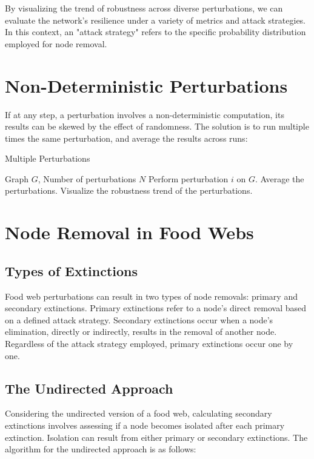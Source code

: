 \documentclass[a4paper, 12pt]{report}
\begin{document}
By visualizing the trend of robustness across diverse perturbations, we can evaluate the network's resilience under a variety of metrics and attack strategies. 
In this context, an "attack strategy" refers to the specific probability distribution employed for node removal. 

\section{Non-Deterministic Perturbations}
If at any step, a perturbation involves a non-deterministic computation,
its results can be skewed by the effect of randomness.
The solution is to run multiple times the same perturbation, 
and average the results across runs:

\begin{minipage}{\textwidth}
\begin{algorithm}[H]
    \caption{Multiple Perturbations}
    \begin{algorithmic}[1]
    \small
    \Require Graph $G$, Number of perturbations $N$
        \State Perform perturbation $i$ on $G$.
    \EndFor
    \State Average the perturbations.
    \State Visualize the robustness trend of the perturbations.
    \end{algorithmic}
\end{algorithm}
\end{minipage}

\section{Node Removal in Food Webs}
\subsection{Types of Extinctions}
Food web perturbations can result in two types of node removals: primary and secondary extinctions. Primary extinctions refer to a node's direct removal based on a defined attack strategy. Secondary extinctions occur when a node's elimination, directly or indirectly, results in the removal of another node. Regardless of the attack strategy employed, primary extinctions occur one by one.

\subsection{The Undirected Approach}
Considering the undirected version of a food web, calculating secondary extinctions involves assessing if a node becomes isolated after each primary extinction. Isolation can result from either primary or secondary extinctions. The algorithm for the undirected approach is as follows:
\end{document}
